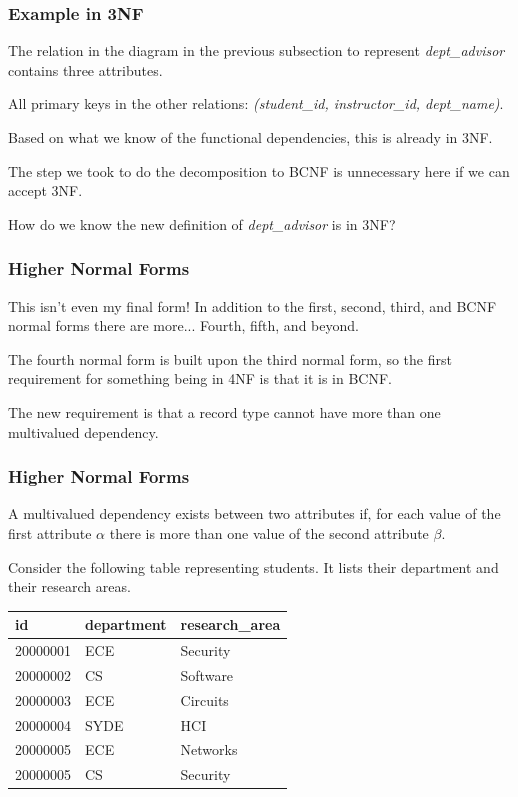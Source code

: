 \begin{frame}
\frametitle{Example in 3NF}

The relation in the diagram in the previous subsection to represent \textit{dept\_advisor} contains three attributes. 

All primary keys in the other relations: \textit{(student\_id, instructor\_id, dept\_name)}. 

Based on what we know of the functional dependencies, this is already in 3NF. 

The step we took to do the decomposition to BCNF is unnecessary here if we can accept 3NF.

How do we know the new definition of \textit{dept\_advisor} is in 3NF?

\end{frame}



\begin{frame}
\frametitle{Higher Normal Forms}

This isn't even my final form! In addition to the first, second, third, and BCNF normal forms there are more... Fourth, fifth, and beyond.  

The fourth normal form is built upon the third normal form, so the first requirement for something being in 4NF is that it is in BCNF. 

The new requirement is that a record type cannot have more than one multivalued dependency.

\end{frame}



\begin{frame}
\frametitle{Higher Normal Forms}

A multivalued dependency exists between two attributes if, for each value of the first attribute $\alpha$ there is more than one value of the second attribute $\beta$.

Consider the following table representing students. It lists their department and their research areas. 

\begin{center}
\begin{tabular}{|l|l|l|} \hline
	\textbf{id} & \textbf{department} & \textbf{research\_area} \\ \hline
	20000001 & ECE & Security \\ \hline
	20000002 & CS & Software \\ \hline
    20000003 & ECE & Circuits \\ \hline
    20000004 & SYDE & HCI \\ \hline
    20000005 & ECE & Networks \\ \hline
    20000005 & CS & Security \\ \hline
\end{tabular}
\end{center}

\end{frame}



